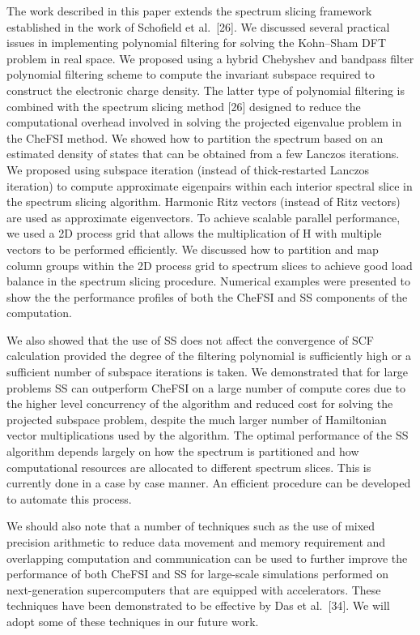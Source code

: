 \documentclass[
  10
]{article}
\begin{document}
The work described in this paper extends the spectrum slicing framework
established in the work of Schofield et al.~{[}26{]}. We discussed
several practical issues in implementing polynomial filtering for
solving the Kohn--Sham DFT problem in real space. We proposed using a
hybrid Chebyshev and bandpass filter polynomial filtering scheme to
compute the invariant subspace required to construct the electronic
charge density. The latter type of polynomial filtering is combined with
the spectrum slicing method {[}26{]} designed to reduce the
computational overhead involved in solving the projected eigenvalue
problem in the CheFSI method. We showed how to partition the spectrum
based on an estimated density of states that can be obtained from a few
Lanczos iterations. We proposed using subspace iteration (instead of
thick-restarted Lanczos iteration) to compute approximate eigenpairs
within each interior spectral slice in the spectrum slicing algorithm.
Harmonic Ritz vectors (instead of Ritz vectors) are used as approximate
eigenvectors. To achieve scalable parallel performance, we used a 2D
process grid that allows the multiplication of H with multiple vectors
to be performed efficiently. We discussed how to partition and map
column groups within the 2D process grid to spectrum slices to achieve
good load balance in the spectrum slicing procedure. Numerical examples
were presented to show the the performance profiles of both the CheFSI
and SS components of the computation.

We also showed that the use of SS does not affect the convergence of SCF
calculation provided the degree of the filtering polynomial is
sufficiently high or a sufficient number of subspace iterations is
taken. We demonstrated that for large problems SS can outperform CheFSI
on a large number of compute cores due to the higher level concurrency
of the algorithm and reduced cost for solving the projected subspace
problem, despite the much larger number of Hamiltonian vector
multiplications used by the algorithm. The optimal performance of the SS
algorithm depends largely on how the spectrum is partitioned and how
computational resources are allocated to different spectrum slices. This
is currently done in a case by case manner. An efficient procedure can
be developed to automate this process.

We should also note that a number of techniques such as the use of mixed
precision arithmetic to reduce data movement and memory requirement and
overlapping computation and communication can be used to further improve
the performance of both CheFSI and SS for large-scale simulations
performed on next-generation supercomputers that are equipped with
accelerators. These techniques have been demonstrated to be effective by
Das et al.~{[}34{]}. We will adopt some of these techniques in our
future work.
\end{document}
